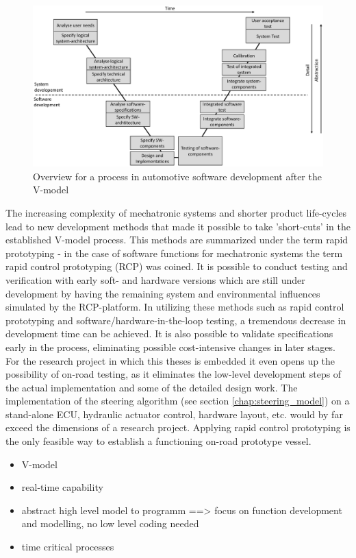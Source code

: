 \documentclass[ExampleMasters.tex]{subfiles}
\begin{document}
\begin{figure}[htpb]
	\centering
	\includegraphics[width=0.9\linewidth]{figures/v_model/Folie1}
	\caption{Overview for a process in automotive software development after the V-model}
	\label{fig:v_model}
\end{figure}



The increasing complexity of mechatronic systems and shorter product life-cycles lead to new development methods that made it possible to take 'short-cuts' in the established V-model process. This methods are summarized under the term rapid prototyping - in the case of software functions for mechatronic systems the term rapid control prototyping (RCP) was coined. It is possible to conduct testing and verification with early soft- and hardware versions which are still under development by having the remaining system and environmental influences simulated by the RCP-platform. In utilizing these methods such as rapid control prototyping and software/hardware-in-the-loop testing, a tremendous decrease in development time can be achieved. It is also possible to validate specifications early in the process, eliminating possible cost-intensive changes in later stages.\cite{rapidcontrolprototyping} For the research project in which this theses is embedded it even opens up the possibility of on-road testing, as it eliminates the low-level development steps of the actual implementation and some of the detailed design work. The implementation of the steering algorithm (see section \ref{chap:steering_model}) on a stand-alone ECU, hydraulic actuator control, hardware layout, etc. would by far exceed the dimensions of a research project. Applying rapid control prototyping is the only feasible way to establish a functioning on-road prototype vessel.


\begin{itemize}
	\item V-model
	\item real-time capability
	\item abstract high level model to programm ==> focus on function development and modelling, no low level coding needed
	\item time critical processes
\end{itemize}
\end{document}

